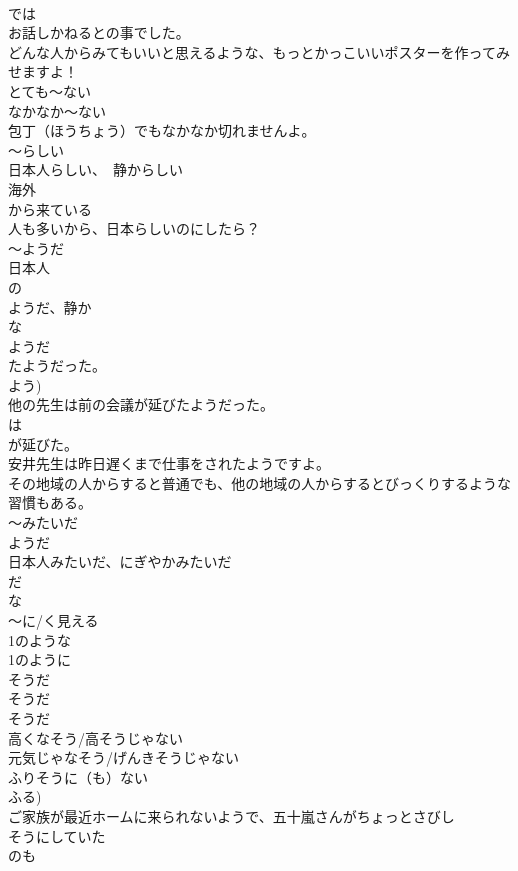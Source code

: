 \documentclass[8pt]{extreport}
\begin{document}
\begin{CJK}{UTF8}{min}
\\	では
\\	お話しかねるとの事でした。
\\	どんな人からみてもいいと思えるような、もっとかっこいいポスターを作ってみせますよ！
\\	とても～ない
\\	なかなか～ない
\\	包丁（ほうちょう）でもなかなか切れませんよ。
\\	～らしい
\\	日本人らしい、　静からしい
\\	海外
\\	から来ている
\\	人も多いから、日本らしいのにしたら？　
\\	～ようだ
\\	日本人
\\	の
\\	ようだ、静か
\\	な
\\	ようだ
\\	たようだった。 
\\	よう)
\\	他の先生は前の会議が延びたようだった。
\\	は
\\	が延びた。 
\\	安井先生は昨日遅くまで仕事をされたようですよ。
\\	その地域の人からすると普通でも、他の地域の人からするとびっくりするような習慣もある。
\\	～みたいだ
\\	ようだ
\\	日本人みたいだ、にぎやかみたいだ　
\\	だ 
\\	な
\\	～に/く見える
\\	1のような
\\	1のように
\\	そうだ
\\	そうだ 
\\	そうだ 
\\	高くなそう/高そうじゃない
\\	元気じゃなそう/げんきそうじゃない
\\	ふりそうに（も）ない　
\\	ふる)
\\	ご家族が最近ホームに来られないようで、五十嵐さんがちょっとさびし
\\	そうにしていた
\\	のも

\end{CJK}
\end{document}
